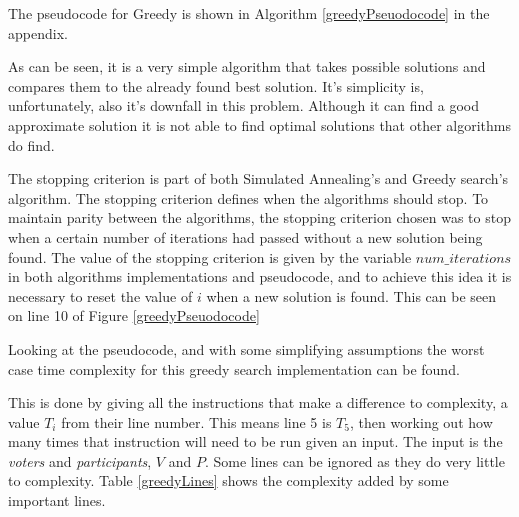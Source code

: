 \documentclass[12pt]{report}
\begin{document}
The pseudocode for Greedy is shown in Algorithm \ref{greedyPseuodocode} in the appendix.

As can be seen, it is a very simple algorithm that takes possible solutions and compares them to the already found best solution. It's simplicity is, unfortunately, also it's downfall in this problem. Although it can find a good approximate solution it is not able to find optimal solutions that other algorithms do find.

The stopping criterion is part of both Simulated Annealing's and Greedy search's algorithm. The stopping criterion defines when the algorithms should stop. To maintain parity between the algorithms, the stopping criterion chosen was to stop when a certain number of iterations had passed without a new solution being found. The value of the stopping criterion is given by the variable $num\_iterations$ in both algorithms implementations and pseudocode, and to achieve this idea it is necessary to reset the value of $i$ when a new solution is found. This can be seen on line 10 of Figure \ref{greedyPseuodocode}

Looking at the pseudocode, and with some simplifying assumptions the worst case time complexity for this greedy search implementation can be found.

This is done by giving all the instructions that make a difference to complexity, a value $T_i$ from their line number. This means line 5 is $T_5$, then working out how many times that instruction will need to be run given an input. The input is the \textit{voters} and \textit{participants}, $V$ and $P$. Some lines can be ignored as they do very little to complexity. Table \ref{greedyLines} shows the complexity added by some important lines.
\end{document}

